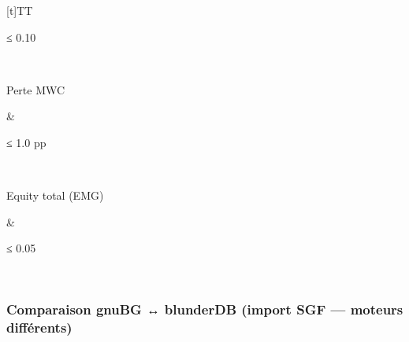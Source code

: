 \documentclass[letterpaper,10pt,french]{sphinxmanual}
\begin{document}
\begin{savenotes}
\begin{tabulary}{\linewidth}[t]{TT}
\begin{varwidth}[t]{}
\sphinxAtStartPar
≤ 0.10
\sphinxbeforeendvarwidth
\end{varwidth}%
\\
\sphinxhline\begin{varwidth}[t]{}
\sphinxAtStartPar
Perte MWC
\sphinxbeforeendvarwidth
\end{varwidth}%
&\begin{varwidth}[t]{}
\sphinxAtStartPar
≤ 1.0 pp
\sphinxbeforeendvarwidth
\end{varwidth}%
\\
\sphinxhline\begin{varwidth}[t]{}
\sphinxAtStartPar
Equity total (EMG)
\sphinxbeforeendvarwidth
\end{varwidth}%
&\begin{varwidth}[t]{}
\sphinxAtStartPar
≤ 0.05
\sphinxbeforeendvarwidth
\end{varwidth}%
\\
\sphinxbottomrule
\end{tabulary}
\sphinxtableafterendhook\par
\sphinxattableend\end{savenotes}


\subsubsection{Comparaison gnuBG ↔ blunderDB (import SGF — moteurs différents)}
\label{\detokenize{stats_parity:comparaison-gnubg-blunderdb-import-sgf-moteurs-differents}}
\end{document}

